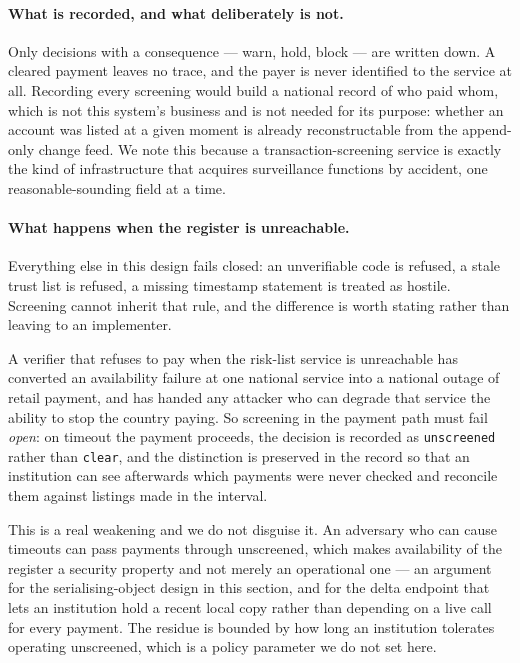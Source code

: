 \documentclass[10pt,a4paper,twocolumn]{article}
\newcommand{\code}[1]{\texttt{\small #1}}
\begin{document}
\paragraph{What is recorded, and what deliberately is not.}
Only decisions with a consequence --- warn, hold, block --- are written down. A
cleared payment leaves no trace, and the payer is never identified to the
service at all. Recording every screening would build a national record of who
paid whom, which is not this system's business and is not needed for its
purpose: whether an account was listed at a given moment is already
reconstructable from the append-only change feed. We note this because a
transaction-screening service is exactly the kind of infrastructure that
acquires surveillance functions by accident, one reasonable-sounding field at a
time.

\paragraph{What happens when the register is unreachable.} Everything else in
this design fails closed: an unverifiable code is refused, a stale trust list is
refused, a missing timestamp statement is treated as hostile. Screening cannot
inherit that rule, and the difference is worth stating rather than leaving to an
implementer.

A verifier that refuses to pay when the risk-list service is unreachable has
converted an availability failure at one national service into a national outage
of retail payment, and has handed any attacker who can degrade that service the
ability to stop the country paying. So screening in the payment path must fail
\emph{open}: on timeout the payment proceeds, the decision is recorded as
\code{unscreened} rather than \code{clear}, and the distinction is preserved in
the record so that an institution can see afterwards which payments were never
checked and reconcile them against listings made in the interval.

This is a real weakening and we do not disguise it. An adversary who can cause
timeouts can pass payments through unscreened, which makes availability of the
register a security property and not merely an operational one --- an argument
for the serialising-object design in this section, and for the delta endpoint
that lets an institution hold a recent local copy rather than depending on a
live call for every payment. The residue is bounded by how long an institution
tolerates operating unscreened, which is a policy parameter we do not set here.
\end{document}
